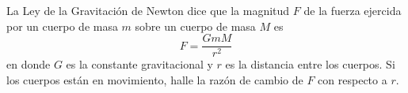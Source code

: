 \item La Ley de la Gravitación de Newton dice que la magnitud $F$ de la fuerza ejercida por un cuerpo de masa $m$ sobre un cuerpo de masa $M$ es
$$F = \frac{GmM}{r^2}$$
en donde $G$ es la constante gravitacional y $r$ es la distancia entre los cuerpos. Si los cuerpos están en movimiento, halle la razón de cambio de $F$ con respecto a $r$.
